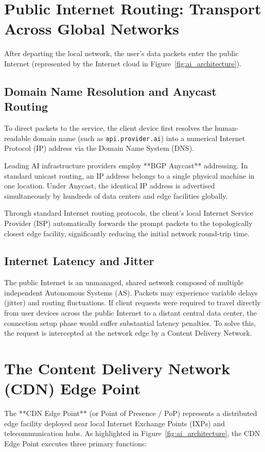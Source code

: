\documentclass[12pt,a4paper]{report}
\begin{document}
\section{Public Internet Routing: Transport Across Global Networks}
After departing the local network, the user's data packets enter the public Internet (represented by the Internet cloud in Figure~\ref{fig:ai_architecture}).

\subsection{Domain Name Resolution and Anycast Routing}
To direct packets to the service, the client device first resolves the human-readable domain name (such as \texttt{api.provider.ai}) into a numerical Internet Protocol (IP) address via the Domain Name System (DNS).

Leading AI infrastructure providers employ **BGP Anycast** addressing. In standard unicast routing, an IP address belongs to a single physical machine in one location. Under Anycast, the identical IP address is advertised simultaneously by hundreds of data centers and edge facilities globally. 

Through standard Internet routing protocols, the client's local Internet Service Provider (ISP) automatically forwards the prompt packets to the topologically closest edge facility, significantly reducing the initial network round-trip time.

\subsection{Internet Latency and Jitter}
The public Internet is an unmanaged, shared network composed of multiple independent Autonomous Systems (AS). Packets may experience variable delays (jitter) and routing fluctuations. If client requests were required to travel directly from user devices across the public Internet to a distant central data center, the connection setup phase would suffer substantial latency penalties. To solve this, the request is intercepted at the network edge by a Content Delivery Network.

\section{The Content Delivery Network (CDN) Edge Point}
The **CDN Edge Point** (or Point of Presence / PoP) represents a distributed edge facility deployed near local Internet Exchange Points (IXPs) and telecommunication hubs. As highlighted in Figure~\ref{fig:ai_architecture}, the CDN Edge Point executes three primary functions:
\end{document}
